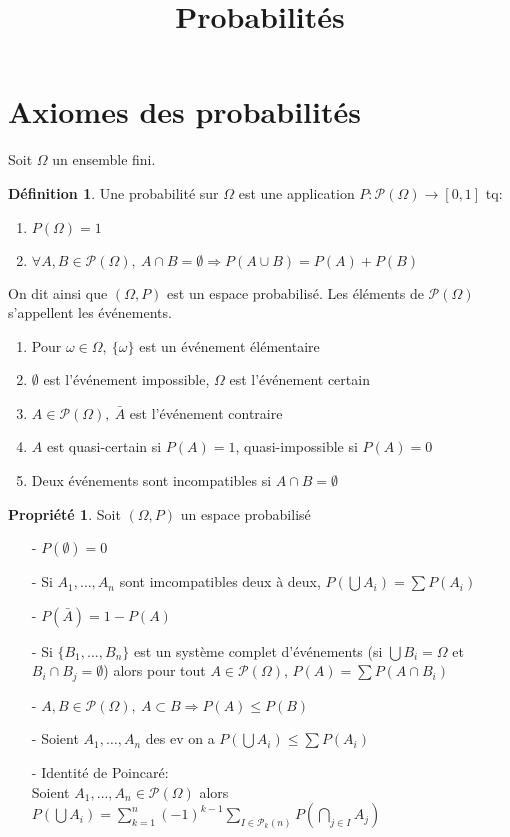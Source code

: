 \documentclass[fleqn]{article}
\title{Probabilit\'es}
\date{}
\theoremstyle{definition} \newtheorem*{defi}{D\'efinition}
\theoremstyle{definition} \newtheorem*{theo}{Th\'eor\`eme}
\theoremstyle{definition} \newtheorem*{coro}{Corollaire}
\theoremstyle{remark} \newtheorem*{rqs}{Remarques}
\theoremstyle{definition} \newtheorem*{prop}{Propri\'et\'e}
\begin{document}
\maketitle

\section{Axiomes des probabilit\'es}
Soit $\Omega$ un ensemble fini.
\begin{defi}
	Une probabilit\'e sur $\Omega$ est une application $P: \mathcal{P}(\Omega) \rightarrow [0,1]$ tq:
	\begin{enumerate}
		\item $P(\Omega) = 1$
		\item $\forall A,B \in \mathcal{P}(\Omega),\ A \cap B = \emptyset \Rightarrow P(A \cup B) = P(A) + P(B)$
	\end{enumerate}
On dit ainsi que $(\Omega,P)$ est un espace probabilis\'e. Les \'el\'ements de $\mathcal{P}(\Omega)$ s'appellent les \'ev\'enements.
	\begin{enumerate}
		\item Pour $\omega \in \Omega,\ \{\omega\}$ est un \'ev\'enement \'el\'ementaire
		\item $\emptyset$ est l'\'ev\'enement impossible, $\Omega$ est l'\'ev\'enement certain
		\item $A \in \mathcal{P}(\Omega),\ \bar{A}$ est l'\'ev\'enement contraire
		\item $A$ est quasi-certain si $P(A) = 1$, quasi-impossible si $P(A) = 0$
		\item Deux \'ev\'enements sont incompatibles si $A \cap B = \emptyset$
	\end{enumerate}
\end{defi}

\begin{prop} Soit $(\Omega, P)$ un espace probabilis\'e
	\begin{itemize}
		\item [-] $P(\emptyset) = 0$
		\item [-] Si $A_1, \hdots, A_n$ sont imcompatibles deux \`a deux, $P(\bigcup A_i) = \sum P(A_i)$
		\item [-] $P(\bar{A}) = 1 - P(A)$
		\item [-] Si $\{B_1, \hdots, B_n\}$ est un syst\`eme complet d'\'ev\'enements (si $\bigcup B_i = \Omega$ et $B_i \cap B_j = \emptyset$)
			alors pour tout $A \in \mathcal{P}(\Omega)$, $P(A) = \sum P(A \cap B_i)$
		\item [-] $A,B \in \mathcal{P}(\Omega),\ A \subset B \Rightarrow P(A) \leq P(B)$
		\item [-] Soient $A_1, \hdots, A_n$ des ev on a $P(\bigcup A_i) \leq \sum P(A_i)$
		\item [-] Identit\'e de Poincar\'e:\\
			Soient $A_1, \hdots, A_n \in \mathcal{P}(\Omega)$ alors $P(\bigcup A_i) = \sum_{k=1}^n (-1)^{k-1} \sum_{I \in \mathcal{P}_k(n)}
			P(\bigcap_{j \in I} A_j)$
	\end{itemize}
\end{prop}
\end{document}
